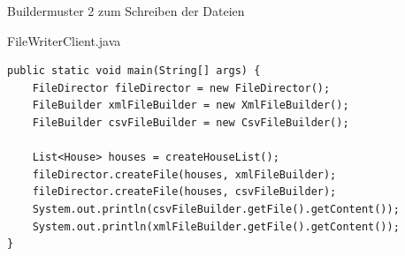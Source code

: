 \begin{frame}[fragile]{Buildermuster 2 zum Schreiben der Dateien}
	\begin{exampleblock}{FileWriterClient.java}
 		\begin{lstlisting}
public static void main(String[] args) {
    FileDirector fileDirector = new FileDirector();
    FileBuilder xmlFileBuilder = new XmlFileBuilder();
    FileBuilder csvFileBuilder = new CsvFileBuilder();
    
    List<House> houses = createHouseList();
    fileDirector.createFile(houses, xmlFileBuilder);
    fileDirector.createFile(houses, csvFileBuilder);
    System.out.println(csvFileBuilder.getFile().getContent());
    System.out.println(xmlFileBuilder.getFile().getContent());
} 		    
 		\end{lstlisting}
 	\end{exampleblock}
\end{frame}